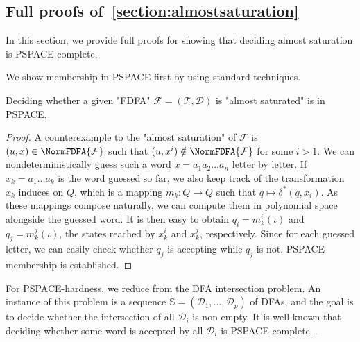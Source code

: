 \documentclass[a4paper,USenglish,cleveref,autoref,thm-restate]{lipics-v2021}
\newcommand{\mc}[1]{\ensuremath{\mathcal{#1}}}
\newcommand{\T}{\mc{T}}
\newcommand{\F}{\mc{F}}
\newcommand{\D}{\mc{D}}
\newcommand{\PSPACE}{\textsf{PSPACE}\xspace}
\begin{document}
{ \subsection{Full proofs of~\cref{section:almostsaturation}}\label{section:appendixalmostsaturation}
In this section, we provide full proofs for showing that deciding almost saturation is \PSPACE-complete.

\almostsaturationPSPACEcomplete*

We show membership in \PSPACE first by using standard techniques.

\begin{lemma}
  Deciding whether a given "FDFA" $\F = (\T, \D)$ is "almost saturated" is in \PSPACE.\label{lemma:powerclosednessPSPACEmembership}
\end{lemma}
\begin{proof}
A counterexample to the "almost saturation" of $\F$ is $(u,x) \in \NormFDFA{\F}$ such that $(u,x^i) \notin \NormFDFA{\F}$ for some $i > 1$.
    We can nondeterministically guess such a word $x = a_1a_2\dotsc a_n$ letter by letter.
    If $x_k = a_1\dots a_k$ is the word guessed so far, we also keep track of the transformation $x_k$ induces on $Q$, which is a mapping $m_k : Q \to Q$ such that $q \mapsto \delta^*(q, x_i)$.
    As these mappings compose naturally, we can compute them in polynomial space alongside the guessed word.
    It is then easy to obtain $q_i = m_k^i(\iota)$ and $q_j = m_k^j(\iota)$, the states reached by $x_k^i$ and $x_k^j$, respectively.
    Since for each guessed letter, we can easily check whether $q_j$ is accepting while $q_j$ is not, \PSPACE membership is established.
\end{proof}

For \PSPACE-hardness, we reduce from the DFA intersection problem.
An instance of this problem is a sequence $\mathbb{S} = (\D_1, \dots,\D_p)$ of DFAs, and the goal is to decide whether the intersection of all $\D_i$ is non-empty.
It is well-known that deciding whether some word is accepted by all $\D_i$ is \PSPACE-complete~\cite{Kozen77}.

}
\end{document}

